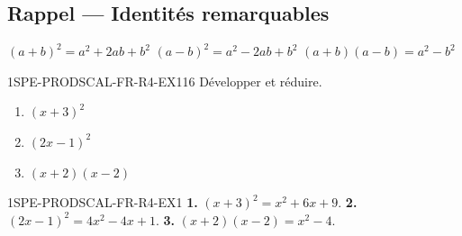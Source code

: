 

\subsection*{Rappel — Identités remarquables}

$(a+b)^2 = a^2 + 2ab + b^2$ \quad $(a-b)^2 = a^2 - 2ab + b^2$ \quad $(a+b)(a-b) = a^2 - b^2$

\begin{exercice}{1SPE-PRODSCAL-FR-R4-EX1}{1}{6}
Développer et réduire.
\begin{enumerate}
  \item $(x+3)^2$
  \item $(2x-1)^2$
  \item $(x+2)(x-2)$
\end{enumerate}
\end{exercice}


\begin{corrige}{1SPE-PRODSCAL-FR-R4-EX1}
\textbf{1.} $(x+3)^2 = x^2 + 6x + 9$.
\textbf{2.} $(2x-1)^2 = 4x^2 - 4x + 1$.
\textbf{3.} $(x+2)(x-2) = x^2 - 4$.
\end{corrige}

